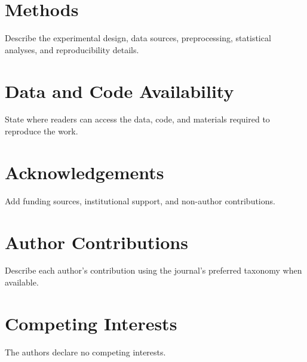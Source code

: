 \documentclass[10pt]{article}
\begin{document}
\section{Methods}

Describe the experimental design, data sources, preprocessing, statistical analyses, and reproducibility details.

\section*{Data and Code Availability}

State where readers can access the data, code, and materials required to reproduce the work.

\section*{Acknowledgements}

Add funding sources, institutional support, and non-author contributions.

\section*{Author Contributions}

Describe each author's contribution using the journal's preferred taxonomy when available.

\section*{Competing Interests}

The authors declare no competing interests.



\end{document}
